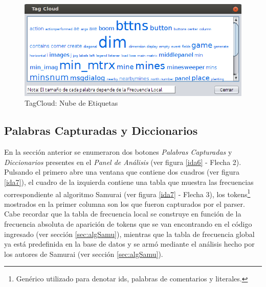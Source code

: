 \documentclass[a4paper,12pt]{report}
\begin{document}
\begin{figure}[t] %
\centerline{%
\includegraphics[scale= 0.75]{./ida_08.png}
}
\caption{TagCloud: Nube de Etiquetas}
\label{ida8}
\end{figure}

\subsection{Palabras Capturadas y Diccionarios}
\label{sec:panPalDicc}

En la sección anterior se enumeraron dos botones \textit{Palabras Capturadas} y \textit{Diccionarios} presentes en el \textit{Panel de Análisis} (ver figura \ref{ida6} - Flecha 2). Pulsando el primero abre una ventana que contiene dos cuadros (ver figura \ref{ida7}), el cuadro de la izquierda contiene una tabla que muestra las frecuencias correspondiente al algoritmo Samurai (ver figura \ref{ida7} - Flecha 3), los tokens\footnote[1]{Genérico utilizado para denotar ids, palabras de comentarios y literales.} mostrados en la primer columna son los que fueron capturados por el parser. Cabe recordar que la tabla de frecuencia local se construye en función de la frecuencia absoluta de aparición de tokens que se van encontrando en el código ingresado (ver sección \ref{sec:algSamu}), mientras que la tabla de frecuencia global ya está predefinida en la base de datos y se armó mediante el análisis hecho por los autores de Samurai (ver sección \ref{sec:algSamu}).
\end{document}
